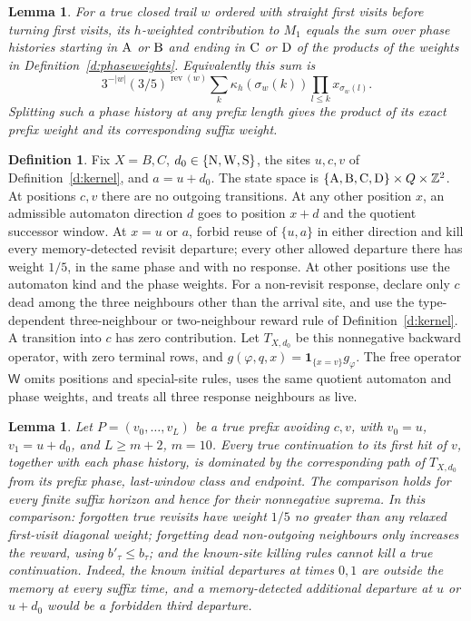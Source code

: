 \documentclass[11pt,reqno]{amsart}
\newtheorem{lemma}[theorem]{Lemma}
\theoremstyle{definition}
\newtheorem{definition}[theorem]{Definition}
\theoremstyle{remark}
\begin{document}
\begin{lemma}\label{l:phase-expansion}
For a true closed trail \(w\) ordered with straight first visits
before turning first visits, its \(h\)-weighted contribution to
\(M_1\) equals the sum over phase histories starting in
\({\rm A}\) or \({\rm B}\) and ending in \({\rm C}\) or \({\rm D}\)
of the products of the weights in Definition~\ref{d:phaseweights}.
Equivalently this sum is
\[
 3^{-|w|}(3/5)^{\operatorname{rev}(w)}
       \sum_k\kappa_h(\sigma_w(k))\prod_{l\le k}x_{\sigma_w(l)}.
\]
Splitting such a phase history at any prefix length gives the
product of its exact prefix weight and its corresponding suffix weight.
\end{lemma}

\begin{definition}\label{d:stationary-walk}
Fix \(X=B,C\), \(d_0\in\{{\rm N},{\rm W},{\rm S}\}\),
the sites \(u,c,v\) of Definition~\ref{d:kernel}, and \(a=u+d_0\).
The state space is
\(\{{\rm A},{\rm B},{\rm C},{\rm D}\}\times Q\times\mathbb Z^2\).
At positions \(c,v\) there are no outgoing transitions.
At any other position \(x\), an admissible automaton direction \(d\)
goes to position \(x+d\) and the quotient successor window.
At \(x=u\) or \(a\), forbid reuse of \(\{u,a\}\) in either
direction and kill every memory-detected revisit departure;
every other allowed departure there has weight \(1/5\),
in the same phase and with no response.
At other positions use the automaton kind and the phase weights.
For a non-revisit response, declare only \(c\) dead among the three
neighbours other than the arrival site, and use the type-dependent
three-neighbour or two-neighbour reward rule of Definition~\ref{d:kernel}.
A transition into \(c\) has zero contribution.
Let \(T_{X,d_0}\) be this nonnegative backward operator, with zero
terminal rows, and \(g(\varphi,q,x)=\mathbf1_{\{x=v\}}g_\varphi\).
The free operator \(\mathsf W\) omits positions and special-site
rules, uses the same quotient automaton and phase weights, and
treats all three response neighbours as live.
\end{definition}

\begin{lemma}\label{l:stationary-domination}
Let \(P=(v_0,\ldots,v_L)\) be a true prefix avoiding \(c,v\),
with \(v_0=u\), \(v_1=u+d_0\), and \(L\ge m+2\), \(m=10\).
Every true continuation to its first hit of \(v\), together with
each phase history, is dominated by the corresponding path of
\(T_{X,d_0}\) from its prefix phase, last-window class and endpoint.
The comparison holds for every finite suffix horizon and hence
for their nonnegative suprema.
In this comparison:
forgotten true revisits have weight \(1/5\) no greater than any
relaxed first-visit diagonal weight; forgetting dead non-outgoing
neighbours only increases the reward, using \(b'_\tau\le b_\tau\);
and the known-site killing rules cannot kill a true continuation.
Indeed, the known initial departures at times \(0,1\) are outside
the memory at every suffix time, and a memory-detected additional
departure at \(u\) or \(u+d_0\) would be a forbidden third departure.
\end{lemma}
\end{document}
